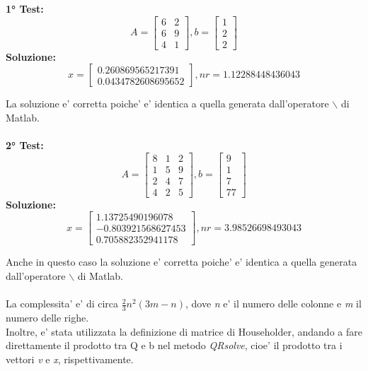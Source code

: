 \documentclass[10pt,a4paper]{article}
\begin{document}
\textbf{1° Test:}
\[
  A =
  \begin{bmatrix}
    6 & 2 \\
    6 & 9 \\
    4 & 1
  \end{bmatrix},
  b =
  \begin{bmatrix}
    1 \\ 2 \\ 2
  \end{bmatrix}
\]
\textbf{Soluzione:}
\[
  x =
  \begin{bmatrix}
    0.260869565217391 \\
    0.0434782608695652
  \end{bmatrix},
  \textit{nr} = 1.12288448436043
\]

La soluzione e' corretta poiche' e' identica a quella generata dall'operatore
$ \backslash $ di Matlab.
\\ \\
\textbf{2° Test:}
\[
  A =
  \begin{bmatrix}
    8 & 1 & 2 \\
    1 & 5 & 9 \\
    2 & 4 & 7 \\
    4 & 2 & 5
  \end{bmatrix},
  b =
  \begin{bmatrix}
    9 \\ 1 \\ 7 \\ 77
  \end{bmatrix}
\]
\textbf{Soluzione:}
\[
  x =
  \begin{bmatrix}
    1.13725490196078   \\
    -0.803921568627453 \\
    0.705882352941178
  \end{bmatrix},
  \textit{nr} = 3.98526698493043
\]

Anche in questo caso la soluzione e' corretta poiche' e' identica a quella
generata dall'operatore $ \backslash $ di Matlab.
\\
\\
La complessita' e' di circa $ \frac{2}{ 3}n^2(3m-n) $, dove \textit{n} e'
il numero delle colonne e \textit{m} il numero delle righe.
\\
Inoltre, e' stata utilizzata la definizione di matrice di Householder,
andando a fare direttamente il prodotto tra Q e b nel metodo \textit{QRsolve},
cioe' il prodotto tra i vettori \textit{v} e \textit{x}, rispettivamente.
\end{document}

